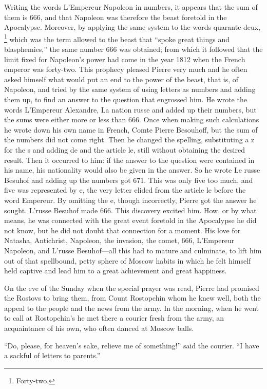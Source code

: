 Writing the words L'Empereur Napoleon in numbers, it appears that
the sum of them is 666, and that Napoleon was therefore the beast
foretold in the Apocalypse. Moreover, by applying the same system
to the words quarante-deux, \footnote{Forty-two.} which was the
term allowed to the beast that ``spoke great things and
blasphemies,'' the same number 666 was obtained; from which it
followed that the limit fixed for Napoleon's power had come in
the year 1812 when the French emperor was forty-two. This
prophecy pleased Pierre very much and he often asked himself what
would put an end to the power of the beast, that is, of Napoleon,
and tried by the same system of using letters as numbers and
adding them up, to find an answer to the question that engrossed
him. He wrote the words L'Empereur Alexandre, La nation russe and
added up their numbers, but the sums were either more or less
than 666. Once when making such calculations he wrote down his
own name in French, Comte Pierre Besouhoff, but the sum of the
numbers did not come right. Then he changed the spelling,
substituting a z for the s and adding de and the article le,
still without obtaining the desired result. Then it occurred to
him: if the answer to the question were contained in his name,
his nationality would also be given in the answer. So he wrote Le
russe Besuhof and adding up the numbers got 671. This was only
five too much, and five was represented by e, the very letter
elided from the article le before the word Empereur. By omitting
the e, though incorrectly, Pierre got the answer he
sought. L'russe Besuhof made 666. This discovery excited him.
How, or by what means, he was connected with the great event
foretold in the Apocalypse he did not know, but he did not doubt
that connection for a moment. His love for Natasha, Antichrist,
Napoleon, the invasion, the comet, 666, L'Empereur Napoleon, and
L'russe Besuhof---all this had to mature and culminate, to lift
him out of that spellbound, petty sphere of Moscow habits in
which he felt himself held captive and lead him to a great
achievement and great happiness.

On the eve of the Sunday when the special prayer was read, Pierre
had promised the Rostovs to bring them, from Count Rostopchin
whom he knew well, both the appeal to the people and the news
from the army. In the morning, when he went to call at
Rostopchin's he met there a courier fresh from the army, an
acquaintance of his own, who often danced at Moscow balls.

``Do, please, for heaven's sake, relieve me of something!'' said
the courier. ``I have a sackful of letters to parents.''

